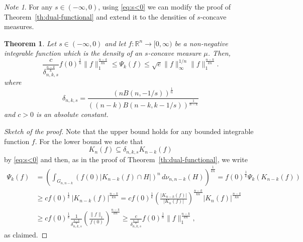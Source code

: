 \documentclass[11pt,leqno]{article}
\newtheorem{theorem}{Theorem}[section]
\theoremstyle{definition}
\theoremstyle{remark}
\newtheorem*{note*}{Note}
\numberwithin{equation}{section}
\newcommand{\ls}{\leqslant}
\newcommand{\gr}{\geqslant}
\newcommand{\1}{\textbf{1}}
\begin{document}
\begin{note*}For any $s\in (-\infty,0)$, using \eqref{eq:s<0} we can modify the proof of Theorem~\ref{th:dual-functional} and extend it to
the densities of $s$-concave measures.
\end{note*}

\begin{theorem}\label{th:dual-functional-s<0}Let $s\in (-\infty,0)$ and let $f:{\mathbb R}^n\to [0,\infty)$ be
a non-negative integrable function which is the density of an $s$-concave measure $\mu$. Then,
$$\frac{c}{\delta_{n,k,s}^{\frac{n-k}{k}}}f(0)^{\frac{1}{n}}\|f\|_1^{\frac{n-k}{kn}}\ls \Psi_k(f) \ls \sqrt{e}\|f\|_{\infty}^{1/n}\|f\|_1^{\frac{n-k}{kn}}.$$
where
$$\delta_{n,k,s}=\frac{(nB(n,-1/s))^{\frac{1}{n}}}{((n-k)B(n-k,k-1/s))^{\frac{1}{n-k}}}$$
and $c>0$ is an absolute constant.
\end{theorem}

\begin{proof}[Sketch of the proof]Note that the upper bound holds for any bounded integrable function $f$. For the lower bound we note
that
$$K_n(f)\subseteq\delta_{n,k,s}K_{n-k}(f)$$
by \eqref{eq:s<0} and then, as in the proof of Theorem~\ref{th:dual-functional}, we write
\begin{align*}
\Psi_k(f) &=\left(\int_{G_{n,n-k}} (f(0)|K_{n-k}(f)\cap H|)^n \,d\nu_{n,n-k}(H) \right)^{\frac{1}{kn}}= f(0)^{\frac{1}{k}}\Psi_k(K_{n-k}(f))\\
&\gr cf(0)^{\frac{1}{k}}\,|K_{n-k}(f)|^{\frac{n-k}{kn}}
=cf(0)^{\frac{1}{k}}\left(\frac{|K_{n-k}(f)|}{|K_n(f)|}\right)^{\frac{n-k}{kn}}|K_n(f)|^{\frac{n-k}{kn}}\\
&\gr cf(0)^{\frac{1}{k}}\frac{1}{\delta_{n,k,s}^{\frac{n-k}{k}}}
\left(\frac{\|f\|_1}{f(0)}\right)^{\frac{n-k}{kn}}\gr \frac{c}{\delta_{n,k,s}^{\frac{n-k}{k}}}f(0)^{\frac{1}{n}}\|f\|_1^{\frac{n-k}{kn}},
\end{align*}
as claimed. \end{proof}
\end{document}
